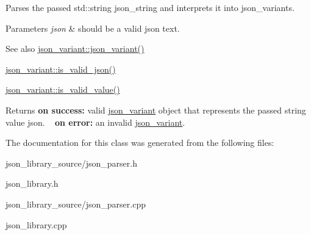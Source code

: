 Parses the passed std\+::string {\ttfamily json\+\_\+string} and interprets it into json\+\_\+variants. 


\begin{DoxyParams}{Parameters}
{\em json} & should be a valid json text. \\
\hline
\end{DoxyParams}
\begin{DoxySeeAlso}{See also}
\hyperlink{classJSONLIB__NAMESPACE_1_1json__variant_a846c20ca7916959fcf8768f6c5bac36d}{json\+\_\+variant\+::json\+\_\+variant()} 

\hyperlink{classJSONLIB__NAMESPACE_1_1json__variant_a158e3148d9256af3d1b8251b2ca7b6c4}{json\+\_\+variant\+::is\+\_\+valid\+\_\+json()} 

\hyperlink{classJSONLIB__NAMESPACE_1_1json__variant_a224aab2dd56e3928dd893be8b7f3367a}{json\+\_\+variant\+::is\+\_\+valid\+\_\+value()} 
\end{DoxySeeAlso}
\begin{DoxyReturn}{Returns}
{\bfseries on success\+:} valid \hyperlink{classJSONLIB__NAMESPACE_1_1json__variant}{json\+\_\+variant} object that represents the passed string value {\ttfamily json}. ~\newline
 {\bfseries on error\+:} an invalid \hyperlink{classJSONLIB__NAMESPACE_1_1json__variant}{json\+\_\+variant}. 
\end{DoxyReturn}


The documentation for this class was generated from the following files\+:\begin{DoxyCompactItemize}
\item 
json\+\_\+library\+\_\+source/json\+\_\+parser.\+h\item 
json\+\_\+library.\+h\item 
json\+\_\+library\+\_\+source/json\+\_\+parser.\+cpp\item 
json\+\_\+library.\+cpp\end{DoxyCompactItemize}
